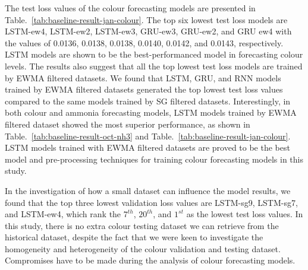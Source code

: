 The test loss values of the colour forecasting models are presented in Table.~\ref{tab:baseline-result-jan-colour}. The top six lowest test loss models are LSTM-ew4, LSTM-ew2, LSTM-ew3, GRU-ew3, GRU-ew2, and GRU ew4 with the values of 0.0136, 0.0138, 0.0138, 0.0140, 0.0142, and 0.0143, respectively. LSTM models are shown to be the best-performanced model in forecasting colour levels. The results also suggest that all the top lowest test loss models are trained by EWMA filtered datasets. We found that LSTM, GRU, and RNN models trained by EWMA filtered datasets generated the top lowest test loss values compared to the same models trained by SG filtered datasets. Interestingly, in both colour and ammonia forecasting models, LSTM models trained by EWMA filtered dataset showed the most superior performance, as shown in Table.~\ref{tab:baseline-result-oct-nh3} and Table.~\ref{tab:baseline-result-jan-colour}. LSTM models trained with EWMA filtered datasets are proved to be the best model and pre-processing techniques for training colour forecasting models in this study.

In the investigation of how a small dataset can influence the model results, we found that the top three lowest validation loss values are LSTM-sg9, LSTM-sg7, and LSTM-ew4, which rank the $7^{th}$, $20^{th}$, and $1^{st}$ as the lowest test loss values. In this study, there is no extra colour testing dataset we can retrieve from the historical dataset, despite the fact that we were keen to investigate the homogeneity and heterogeneity of the colour validation and testing dataset. Compromises have to be made during the analysis of colour forecasting models.

